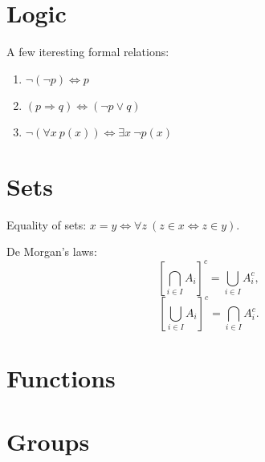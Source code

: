 \documentclass[12pt, a4paper]{article}
\begin{document}
\section{Logic}
A few iteresting formal relations:
\begin{enumerate}
    \item $\neg (\neg p) \Leftrightarrow p$
    \item $(p \Rightarrow q) \Leftrightarrow (\neg p \vee q)$
    \item $\neg (\forall x \ p(x)) \Leftrightarrow \exists x \ \neg p(x) $
\end{enumerate}

\section{Sets}
Equality of sets: $x = y \Leftrightarrow \forall z \ (z \in x \Leftrightarrow z \in y)$.

De Morgan's laws:
\[ \left[ \bigcap _{i\in I}A_{i} \right] ^{c} = \bigcup _{i\in I}{A_{i}^{c}}, \]
\[ \left[ \bigcup _{i\in I}A_{i} \right] ^{c} = \bigcap _{i\in I}{A_{i}^{c}}. \]

\section{Functions}

\section{Groups}
\end{document}
